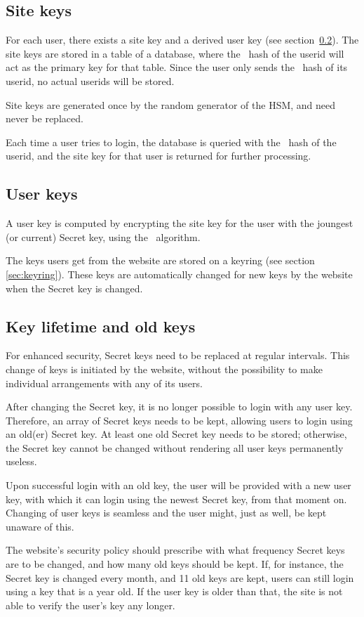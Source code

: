 \subsection{Site keys}
For each user, there exists a site key and a derived user key (see section~\ref{sec:userkeys}).
The site keys are stored in a table of a database,
where the \SHA\ hash of the userid will act as the primary key for that table.
Since the user only sends the \SHA\ hash of its userid, no actual userids will be stored.
\par
Site keys are generated once by the random generator of the HSM, and need never be replaced.
\par
Each time a user tries to login,
the database is queried with the \SHA\ hash of the userid,
and the site key for that user is returned for further processing.

\subsection{User keys}
\label{sec:userkeys}
A user key is computed by encrypting the site key for the user with the joungest (or current) Secret key,
using the \AES\ algorithm.
\par
The keys users get from the website are stored on a keyring (see section \ref{sec:keyring}).
These keys are automatically changed for new keys by the website when the Secret key is changed.

\subsection{Key lifetime and old keys}
For enhanced security, Secret keys need to be replaced at regular intervals.
This change of keys is initiated by the website,
without the possibility to make individual arrangements with any of its users.
\par
After changing the Secret key, it is no longer possible to login with any user key.
Therefore, an array of Secret keys needs to be kept, allowing users to login using an old(er) Secret key.
At least one old Secret key needs to be stored; otherwise, the Secret key cannot be changed without rendering all user keys permanently useless.
\par
Upon successful login with an old key, the user will be provided with a new user key,
with which it can login using the newest Secret key, from that moment on.
Changing of user keys is seamless and the user might, just as well, be kept unaware of this.
\par
The website's security policy should prescribe with what frequency Secret keys are to be changed, and how many old keys should be kept.
If, for instance, the Secret key is changed every month, and 11 old keys are kept, users can still login using a key that is a year old.
If the user key is older than that, the site is not able to verify the user's key any longer.

